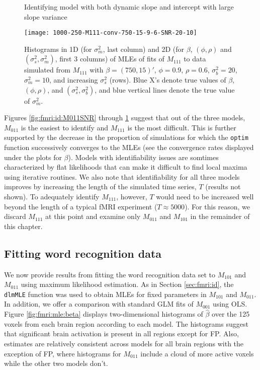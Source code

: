 \begin{figure}
\ssp
\centering
\caption{Identifying model with both dynamic slope and intercept with large slope variance} \label{fig:fmri:id:M111highb}
\texttt{[image: 1000-250-M111-conv-750-15-9-6-SNR-20-10]}
\caption*{Histograms in 1D (for $\sigma^2_m$, last column) and 2D (for $\beta$, $(\phi,\rho)$ and $(\sigma^2_s,\sigma^2_m)$, first 3 columns) of MLEs of fits of $M_{111}$ to data simulated from $M_{111}$ with $\beta = (750,15)'$, $\phi = 0.9$, $\rho = 0.6$, $\sigma^2_b = 20$, $\sigma^2_m = 10$, and increasing $\sigma^2_s$ (rows). Blue X's denote true values of $\beta$, $(\phi,\rho)$, and $(\sigma^2_s,\sigma^2_b)$, and blue vertical lines denote the true value of $\sigma^2_m$.}
\end{figure}

Figures \ref{fig:fmri:id:M011SNR} through \ref{fig:fmri:id:M111highb} suggest that out of the three models, $M_{011}$ is the easiest to identify and $M_{111}$ is the most difficult. This is further supported by the decrease in the proportion of simulations for which the {\tt optim} function successively converges to the MLEs (see the convergence rates displayed under the plots for $\beta$). Models with identifiability issues are somtimes characterized by flat likelihoods that can make it difficult to find local maxima using iterative routines. We also note that identifiability for all three models improves by increasing the length of the simulated time series, $T$ (results not shown). To adequately identify $M_{111}$, however, $T$ would need to be increased well beyond the length of a typical fMRI experiment ($T \approx 5000$). For this reason, we discard $M_{111}$ at this point and examine only $M_{011}$ and $M_{101}$ in the remainder of this chapter.

\subsection{Fitting word recognition data \label{sec:fmri:mle}}

We now provide results from fitting the word recognition data set to $M_{101}$ and $M_{011}$ using maximum likelihood estimation. As in Section \ref{sec:fmri:id}, the {\tt dlmMLE} function was used to obtain MLEs for fixed parameters in $M_{101}$ and $M_{011}$. In addition, we offer a comparison with standard GLM fits of $M_{001}$ using OLS. Figure \ref{fig:fmri:mle:beta} displays two-dimensional histograms of $\hat{\beta}$ over the 125 voxels from each brain region according to each model. The histograms suggest that significant brain activation is present in all regions except for FP. Also, estimates are relatively consistent across models for all brain regions with the exception of FP, where histograms for $M_{011}$ include a cloud of more active voxels while the other two models don't.

